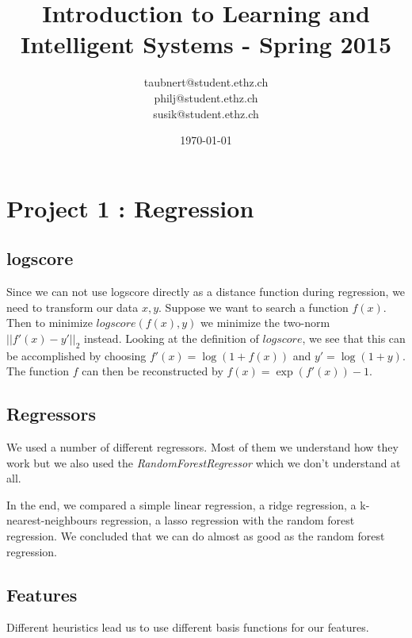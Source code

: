 \documentclass[a4paper, 11pt]{article}
\title{Introduction to Learning and Intelligent Systems - Spring 2015}
\author{taubnert@student.ethz.ch\\ philj@student.ethz.ch\\ susik@student.ethz.ch\\}
\date{\today}
\begin{document}
\maketitle

\section*{Project 1 : Regression}



\subsection{logscore}
Since we can not use logscore directly as a distance function during regression,
we need to transform our data $x,y$.
Suppose we want to search a function $f(x)$.
Then to minimize $logscore(f(x),y)$ we minimize the two-norm $||f'(x) - y'||_2$ instead.
Looking at the definition of $logscore$, we see that this can be accomplished by choosing $f'(x) = \log(1 + f(x))$ and $y' = \log(1 + y)$.
The function $f$ can then be reconstructed by $f(x) = \exp(f'(x)) - 1$.

\subsection{Regressors}
We used a number of different regressors.
Most of them we understand how they work but we also used the \emph{RandomForestRegressor} which we don't understand at all.

In the end, we compared a simple linear regression, a ridge regression, a k-nearest-neighbours regression, a lasso regression with the random forest regression.
We concluded that we can do almost as good as the random forest regression.

\subsection{Features}
Different heuristics lead us to use different basis functions for our features.



\end{document}
